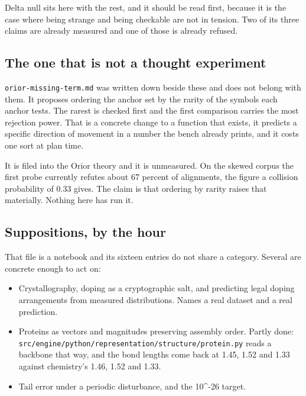 Delta null sits here with the rest, and it should be read first, because it is the case where being strange and being checkable are not in tension. Two of its three claims are already measured and one of those is already refused.

\subsection{The one that is not a thought experiment}

\texttt{orior-\allowbreak{}missing-\allowbreak{}term.\allowbreak{}md} was written down beside these and does not belong with them. It proposes ordering the anchor set by the rarity of the symbols each anchor tests. The rarest is checked first and the first comparison carries the most rejection power. That is a concrete change to a function that exists, it predicts a specific direction of movement in a number the bench already prints, and it costs one sort at plan time.

It is filed into the Orior theory and it is unmeasured. On the skewed corpus the first probe currently refutes about 67 percent of alignments, the figure a collision probability of 0.33 gives. The claim is that ordering by rarity raises that materially. Nothing here has run it.

\subsection{Suppositions, by the hour}

That file is a notebook and its sixteen entries do not share a category. Several are concrete enough to act on:

\begin{itemize}
\item Crystallography, doping as a cryptographic salt, and predicting legal doping arrangements from measured distributions. Names a real dataset and a real prediction.
\item Proteins as vectors and magnitudes preserving assembly order. Partly done: \texttt{src/\allowbreak{}engine/\allowbreak{}python/\allowbreak{}representation/\allowbreak{}structure/\allowbreak{}protein.\allowbreak{}py} reads a backbone that way, and the bond lengths come back at 1.45, 1.52 and 1.33 against chemistry's 1.46, 1.52 and 1.33.
\item Tail error under a periodic disturbance, and the 10\textasciicircum{}-26 target.
\end{itemize}

